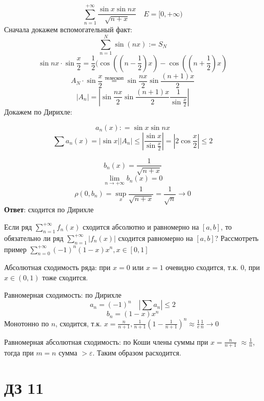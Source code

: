 \begin{exercise}[2781]
    \[\sum_{n = 1}^{+\infty} \frac{\sin x \sin nx}{\sqrt{n + x}} \quad E = [0, +\infty)\]
    Сначала докажем вспомогательный факт:
    \[\sum_{n = 1}^N \sin (nx) := S_N\]
    \[\sin nx \cdot \sin \frac{x}{2} = \frac{1}{2}(\cos \left(\left( n - \frac{1}{2} \right)x\right) - \cos \left(\left( n + \frac{1}{2} \right)x\right)\]
    \[A_N \cdot \sin \frac{x}{2} \stackrel{\text{телескоп}}{=} \sin \frac{nx}{2} \sin \frac{(n + 1)x}{2} \]
    \[|A_n| = |\sin \frac{nx}{2} \sin \frac{(n + 1)x}{2} \frac{1}{\sin \frac{x}{2}}|\]
    Докажем по Дирихле:

    \[a_n(x) : = \sin x \sin nx\]
    \[\sum a_n(x) = |\sin x| \left|A_n\right| \leq \left|\frac{\sin x}{\sin \frac{x}{2}} \right|  = |2\cos \frac{x}{2}| \leq 2\]

    \[b_n(x) = \frac{1}{\sqrt{n + x}}\]
    \[\lim_{n\to +\infty} b_n(x) = 0\]
    \[\rho(0, b_n) = \sup_x \frac{1}{\sqrt{n + x}} = \frac{1}{\sqrt{n}} \to 0\]
    \textbf{Ответ}: сходится по Дирихле
\end{exercise}

\begin{exercise}[2785]
    Если ряд \(\sum\limits_{n = 1}^{+\infty} f_n(x)\) сходится абсолютно и равномерно на \([a, b]\), то обязательно ли ряд \(\sum\limits_{n = 1}^{+\infty} |f_n(x)|\) сходится равномерно на \([a, b]\)?
    Рассмотреть пример \(\sum\limits_{n = 0}^{+\infty}( - 1)^n(1 - x)x^n, x\in[0, 1]\)

    Абсолютная сходимость ряда: при \(x = 0\) или \(x = 1\) очевидно сходится, т.к. \(0\), при \(x\in(0, 1)\) тоже сходится.

    Равномерная сходимость: по Дирихле
    \[a_n = ( - 1)^n \quad \left|\sum a_n\right| \leq 2\]
    \[b_n = (1 - x)x^n\]
    Монотонно по \(n\), сходится, т.к. \(x = \frac{n}{n + 1}, \frac{1}{n + 1}\left( 1 - \frac{1}{n + 1} \right)^n \approx \frac{1}{e} \frac{1}{n} \to 0\)

    Равномерная абсолютная сходимость: по Коши члены суммы при \(x = \frac{n}{n + 1}\) \(\approx \frac{1}{n}\), тогда при \(m = n\) сумма \( > \varepsilon\). Таким образом расходится.
\end{exercise}

\section*{ДЗ 11}


